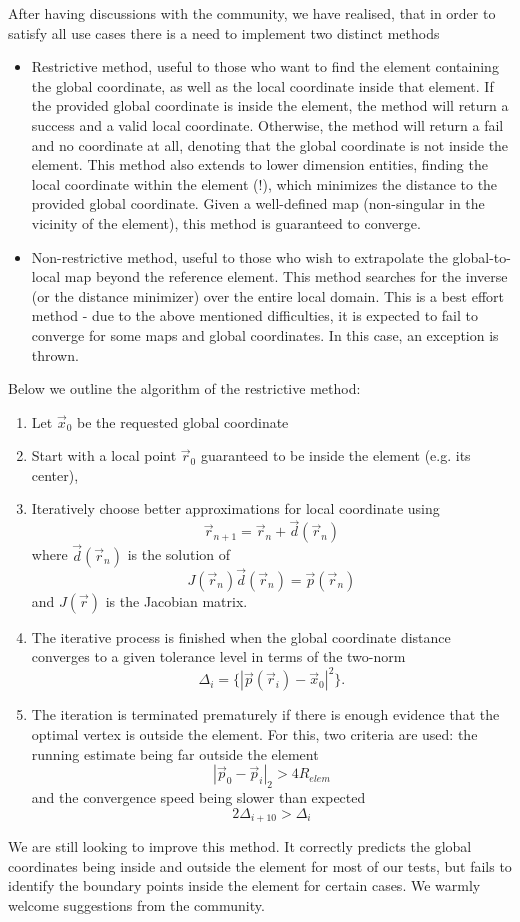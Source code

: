\noindent
After having discussions with the community, we have realised, that in order to satisfy all use cases there is a need to implement two distinct methods
\begin{itemize}
  \item Restrictive method, useful to those who want to find the element containing the global coordinate, as well as the local coordinate inside that element. If the provided global coordinate is inside the element, the method will return a success and a valid local coordinate. Otherwise, the method will return a fail and no coordinate at all, denoting that the global coordinate is not inside the element. This method also extends to lower dimension entities, finding the local coordinate within the element (!), which minimizes the distance to the provided global coordinate. Given a well-defined map (non-singular in the vicinity of the element), this method is guaranteed to converge.
  \item Non-restrictive method, useful to those who wish to extrapolate the global-to-local map beyond the reference element. This method searches for the inverse (or the distance minimizer) over the entire local domain. This is a best effort method - due to the above mentioned difficulties, it is expected to fail to converge for some maps and global coordinates. In this case, an exception is thrown.
\end{itemize}

\noindent
Below we outline the algorithm of the restrictive method:

\begin{mybox}
\begin{enumerate}
	\item Let $\vec{x}_0$ be the requested global coordinate
	\item Start with a local point $\vec{r}_0$ guaranteed to be inside the element (e.g. its center),
	\item Iteratively choose better approximations for local coordinate using \[\vec{r}_{n+1} = \vec{r}_n + \vec{d}(\vec{r}_n)\] where $\vec{d}(\vec{r}_n)$ is the solution of
	        \[ J(\vec{r}_n) \vec{d}(\vec{r}_n) = \vec{p}(\vec{r}_n) \] and $J(\vec{r})$ is the Jacobian matrix.
	\item The iterative process is finished when the global coordinate distance converges to a given tolerance level in terms of the two-norm
	        \[\Delta_i = \{ |\vec{p}(\vec{r}_i) - \vec{x}_0 |^2 \}. \]
	\item The iteration is terminated prematurely if there is enough evidence that the optimal vertex is outside the element. For this, two criteria are used: the running estimate being far outside the element \[|\vec{p}_0 - \vec{p}_i|_2 > 4 R_{elem}\] and the convergence speed being slower than expected \[ 2 \Delta_{i + 10} > \Delta_{i} \]
\end{enumerate}
\end{mybox}

\noindent
We are still looking to improve this method. It correctly predicts the global coordinates being inside and outside the element for most of our tests, but fails to identify the boundary points inside the element for certain cases. We warmly welcome suggestions from the community.